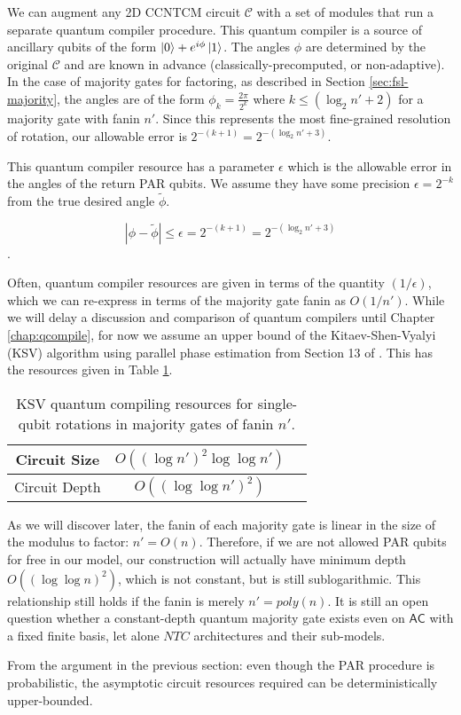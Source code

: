 We can augment any \textsf{2D CCNTCM} circuit $\mathcal{C}$ with a set of modules that run a
separate quantum compiler procedure. This quantum compiler is a source
of ancillary qubits of the form 
$\left\vert{0}\right\rangle + e^{i\phi}\left\vert{1}\right\rangle$. The angles $\phi$ are determined by
the original $\mathcal{C}$ and are known in advance (classically-precomputed,
or non-adaptive). In the case of majority gates for factoring,
as described in Section \ref{sec:fsl-majority}, the angles are of the
form $\phi_k = \frac{2\pi}{2^k}$ where $k \le (\log_2 n' + 2)$ for a majority
gate with fanin $n'$. Since this represents the most fine-grained resolution of
rotation, our allowable error is $2^{-(k+1)} = 2^{-(\log_2 n' + 3)}$.

This quantum compiler resource has a parameter $\epsilon$ which is the
allowable error in the angles of the return PAR qubits.
We assume they have some precision $\epsilon = 2^{-k}$ from the
true desired angle $\tilde{\phi}$.

\begin{equation}
| \phi - \tilde{\phi} | \le \epsilon = 2^{-(k+1)} = 2^{-(\log_2 n' + 3)}
\end{equation}.

Often, quantum compiler resources are given in terms of the quantity
$(1/\epsilon)$, which we can re-express in terms of the
majority gate fanin as $O(1/n')$. 
While we will delay a discussion and comparison of
quantum compilers until Chapter \ref{chap:qcompile}, for now
we assume an upper bound of the Kitaev-Shen-Vyalyi (KSV) algorithm
using parallel phase estimation from Section 13 of \cite{Kitaev2002}.
This has the resources given in Table \ref{tab:fsl-ksv}.

\begin{table}[tbp!]
\begin{tabular}{|c|c|c|}
\hline
Circuit Size & $O((\log n')^2\log\log n')$ \\
\hline
Circuit Depth & $O((\log\log n')^2)$\\
\hline
\end{tabular}
\caption{KSV quantum compiling resources for single-qubit rotations in majority gates of fanin $n'$.}
\label{tab:fsl-ksv}
\end{table}

As we will discover later, the fanin of each majority gate is
linear in the size of the modulus to factor: $n' = O(n)$.
Therefore, if we are not allowed PAR qubits for free in our model,
our construction will actually have minimum depth $O((\log\log n)^2)$,
which is not constant, but is still sublogarithmic. This relationship still
holds if the fanin is merely $n' = poly(n)$. It is still an
open question \cite{Hoyer2002} whether a constant-depth
quantum majority gate exists even on $\textsf{AC}$ with a fixed finite basis,
let alone
${NTC}$ architectures and their sub-models.

From the argument in the previous section: even though the PAR procedure is
probabilistic, the asymptotic circuit resources required can be
deterministically upper-bounded.